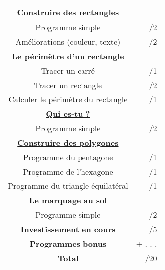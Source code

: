 \documentclass[a4paper,11pt]{article}
\begin{document}
\begin{tabular}{|c|r|}
\hline 
\textbf{\underline{Construire des rectangles}} &  \\ 
\hline 
Programme simple & /2 \\ 
\hline 
Améliorations (couleur, texte) & /2 \\ 
\hline 
\textbf{\underline{Le périmètre d'un rectangle}} &  \\ 
\hline 
Tracer un carré & /1 \\ 
\hline 
Tracer un rectangle & /2 \\ 
\hline 
Calculer le périmètre du rectangle & /1 \\ 
\hline
\textbf{\underline{Qui es-tu ?}} &  \\ 
\hline 
Programme simple & /2 \\ 
\hline 
\textbf{\underline{Construire des polygones}} & \\ 
\hline 
Programme du pentagone & /1 \\ 
\hline 
Programme de l'hexagone & /1 \\ 
\hline 
Programme du triangle équilatéral & /1 \\ 
\hline 
\textbf{\underline{Le marquage au sol}} &  \\ 
\hline 
Programme simple & /2 \\ 
\hline 
\textbf{Investissement en cours} & /5 \\ 
\hline 
\textbf{Programmes bonus} & + . . . \\ 
\hline 
\textbf{Total} & /20\\ 
\hline 

\end{tabular} 
\end{document}
